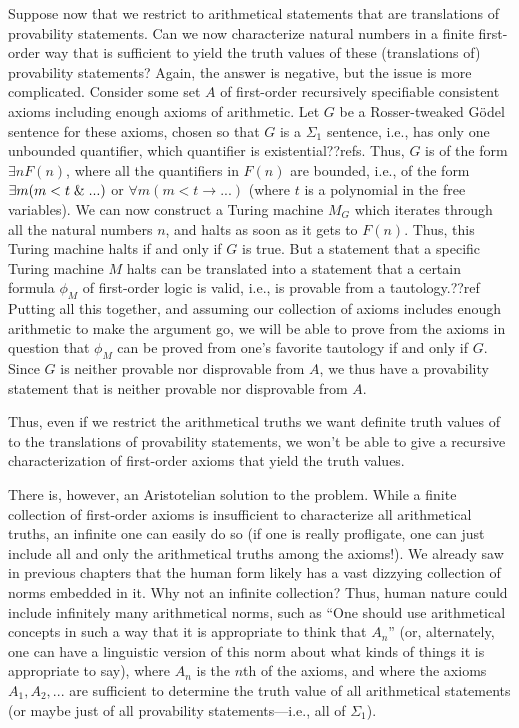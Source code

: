 Suppose now that we restrict  to arithmetical statements that are translations of provability statements.
Can we now characterize natural numbers in a finite first-order way that is sufficient to yield the truth values of these 
(translations of) provability statements? Again, the answer is negative, but the issue is more complicated. Consider some 
set $A$ of first-order recursively specifiable consistent axioms including enough axioms of arithmetic. Let $G$ be a Rosser-tweaked
G\"odel sentence for these axioms, chosen so that $G$ is a $\Sigma_1$ sentence, i.e., has only one unbounded quantifier, 
which quantifier is existential??refs. Thus, $G$ is of the form $\exists n F(n)$, where all the quantifiers in $F(n)$ are 
bounded, i.e., of the form $\exists m (m<t \mathrel{\&} ...)$ or $\forall m(m<t \rightarrow ...)$ (where $t$ is a polynomial
in the free variables). We can now construct a Turing
machine $M_G$ which iterates through all the natural numbers $n$, and halts as soon as it gets to $F(n)$. Thus, this Turing machine
halts if and only if $G$ is true. But a statement that a specific Turing machine $M$ halts can be translated into a statement
that a certain formula $\phi_M$ of first-order logic is valid, i.e., is provable from a tautology.??ref Putting all this together,
and assuming our collection of axioms includes enough arithmetic to make the argument go, we will be able to prove from the 
axioms in question that $\phi_M$ can be proved from one's favorite tautology if and only if $G$. Since $G$ is neither 
provable nor disprovable from $A$, we thus have a provability statement that is neither provable nor disprovable
from $A$.

Thus, even if we restrict the arithmetical truths we want definite truth values of to the translations of provability
statements, we won't be able to give a recursive characterization of first-order axioms that yield the truth values.

There is, however, an Aristotelian solution to the problem. While a finite collection of first-order axioms is insufficient 
to characterize all arithmetical truths, an infinite one can easily do so (if one is really profligate, one can just include all and only the arithmetical truths among the axioms!). We already saw in previous chapters that the human form likely has a vast
dizzying collection of norms embedded in it. Why not an infinite collection? Thus, human nature could include infinitely many arithmetical norms, such as ``One should use arithmetical concepts in such a way that it is appropriate to think that $A_n$'' (or, alternately, one can have a linguistic version of this norm about what kinds of things it is appropriate to say), where $A_n$ is the $n$th of the axioms, and where the axioms $A_1,A_2,...$ are sufficient to determine the truth value of all arithmetical statements (or maybe just of all 
provability statements---i.e., all of $\Sigma_1$).

